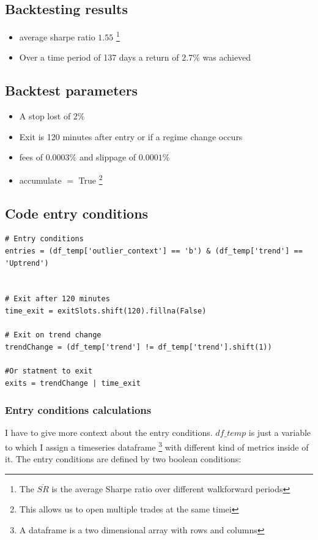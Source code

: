 \documentclass[12pt]{article}
\begin{document}
\subsection{Backtesting results}

\begin{itemize}
    \item average sharpe ratio $1.55$ \footnote{The $\overline{SR}$ is the average Sharpe ratio over different walkforward periods}
    \item Over a time period of 137 days a return of $2.7\%$ was achieved
\end{itemize}


\subsection{Backtest parameters}

\begin{itemize}
    \item A stop lost of $2\%$ 
    \item Exit is 120 minutes after entry or if a regime change occurs
    \item fees of $0.0003\%$ and slippage of $0.0001\%$ 
    \item accumulate $=$ True \footnote{This allows us to open multiple trades at the same timei}
\end{itemize}


\subsection{Code entry conditions}

\begin{verbatim}
# Entry conditions
entries = (df_temp['outlier_context'] == 'b') & (df_temp['trend'] == 'Uptrend')


# Exit after 120 minutes
time_exit = exitSlots.shift(120).fillna(False)    

# Exit on trend change
trendChange = (df_temp['trend'] != df_temp['trend'].shift(1))  

#Or statment to exit 
exits = trendChange | time_exit
\end{verbatim}




\newpage
\subsubsection{Entry conditions calculations}
I have to give more context about the entry conditions. $df\_temp$ is just a variable to which I assign a timeseries dataframe \footnote{A dataframe is a two dimensional array with rows and columns} with different kind of metrics inside of it. The entry conditions are defined by two boolean conditions:
\end{document}
